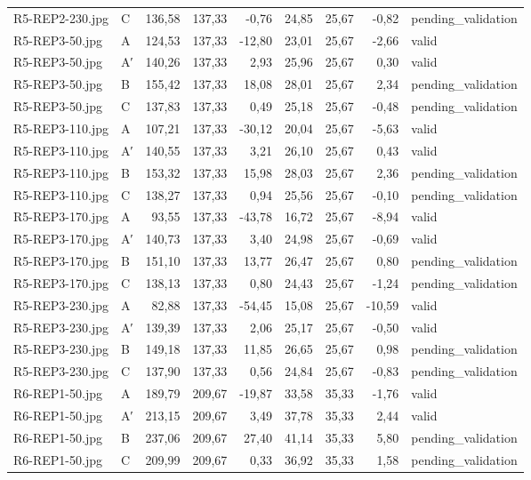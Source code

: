 \begin{scriptsize}
\begin{longtable}{@{}llrrrrrrl@{}}
R5-REP2-230.jpg & C & 136,58 & 137,33 & -0,76 & 24,85 & 25,67 & -0,82 & pending\_validation \\
R5-REP3-50.jpg & A & 124,53 & 137,33 & -12,80 & 23,01 & 25,67 & -2,66 & valid \\
R5-REP3-50.jpg & A′ & 140,26 & 137,33 & 2,93 & 25,96 & 25,67 & 0,30 & valid \\
R5-REP3-50.jpg & B & 155,42 & 137,33 & 18,08 & 28,01 & 25,67 & 2,34 & pending\_validation \\
R5-REP3-50.jpg & C & 137,83 & 137,33 & 0,49 & 25,18 & 25,67 & -0,48 & pending\_validation \\
R5-REP3-110.jpg & A & 107,21 & 137,33 & -30,12 & 20,04 & 25,67 & -5,63 & valid \\
R5-REP3-110.jpg & A′ & 140,55 & 137,33 & 3,21 & 26,10 & 25,67 & 0,43 & valid \\
R5-REP3-110.jpg & B & 153,32 & 137,33 & 15,98 & 28,03 & 25,67 & 2,36 & pending\_validation \\
R5-REP3-110.jpg & C & 138,27 & 137,33 & 0,94 & 25,56 & 25,67 & -0,10 & pending\_validation \\
R5-REP3-170.jpg & A & 93,55 & 137,33 & -43,78 & 16,72 & 25,67 & -8,94 & valid \\
R5-REP3-170.jpg & A′ & 140,73 & 137,33 & 3,40 & 24,98 & 25,67 & -0,69 & valid \\
R5-REP3-170.jpg & B & 151,10 & 137,33 & 13,77 & 26,47 & 25,67 & 0,80 & pending\_validation \\
R5-REP3-170.jpg & C & 138,13 & 137,33 & 0,80 & 24,43 & 25,67 & -1,24 & pending\_validation \\
R5-REP3-230.jpg & A & 82,88 & 137,33 & -54,45 & 15,08 & 25,67 & -10,59 & valid \\
R5-REP3-230.jpg & A′ & 139,39 & 137,33 & 2,06 & 25,17 & 25,67 & -0,50 & valid \\
R5-REP3-230.jpg & B & 149,18 & 137,33 & 11,85 & 26,65 & 25,67 & 0,98 & pending\_validation \\
R5-REP3-230.jpg & C & 137,90 & 137,33 & 0,56 & 24,84 & 25,67 & -0,83 & pending\_validation \\
R6-REP1-50.jpg & A & 189,79 & 209,67 & -19,87 & 33,58 & 35,33 & -1,76 & valid \\
R6-REP1-50.jpg & A′ & 213,15 & 209,67 & 3,49 & 37,78 & 35,33 & 2,44 & valid \\
R6-REP1-50.jpg & B & 237,06 & 209,67 & 27,40 & 41,14 & 35,33 & 5,80 & pending\_validation \\
R6-REP1-50.jpg & C & 209,99 & 209,67 & 0,33 & 36,92 & 35,33 & 1,58 & pending\_validation \\

\end{longtable}
\end{scriptsize}
